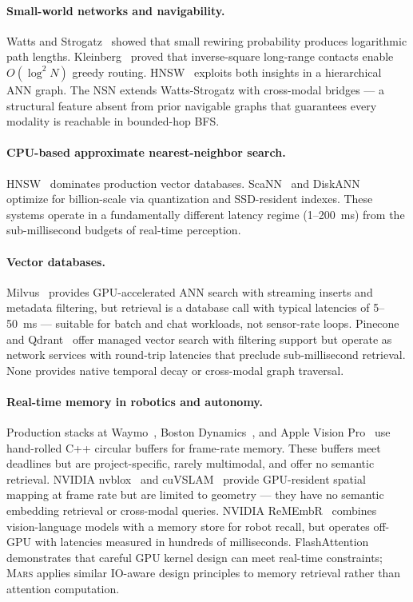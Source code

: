 \documentclass[11pt]{article}
\newcommand{\mars}{\textsc{Mars}}
\begin{document}
\paragraph{Small-world networks and navigability.}
Watts and Strogatz~\cite{wattsstrogatz} showed that small rewiring
probability produces logarithmic path lengths.
Kleinberg~\cite{kleinberg} proved that inverse-square long-range
contacts enable $O(\log^2 N)$ greedy routing. HNSW~\cite{hnsw} exploits
both insights in a hierarchical ANN graph. The NSN extends
Watts-Strogatz with cross-modal bridges --- a structural feature absent
from prior navigable graphs that guarantees every modality is reachable
in bounded-hop BFS.

\paragraph{CPU-based approximate nearest-neighbor search.}
HNSW~\cite{hnsw} dominates production vector databases.
ScaNN~\cite{scann} and DiskANN~\cite{diskann} optimize for
billion-scale via quantization and SSD-resident indexes. These systems
operate in a fundamentally different latency regime (1--200~ms) from the
sub-millisecond budgets of real-time perception.

\paragraph{Vector databases.}
Milvus~\cite{milvus} provides GPU-accelerated ANN search with streaming
inserts and metadata filtering, but retrieval is a database call with
typical latencies of 5--50~ms --- suitable for batch and chat workloads,
not sensor-rate loops. Pinecone~\cite{pinecone} and
Qdrant~\cite{qdrant} offer managed vector search with filtering support
but operate as network services with round-trip latencies that preclude
sub-millisecond retrieval. None provides native temporal decay or
cross-modal graph traversal.

\paragraph{Real-time memory in robotics and autonomy.}
Production stacks at Waymo~\cite{waymo2020}, Boston
Dynamics~\cite{atlasctrl}, and Apple Vision Pro~\cite{visionpro} use
hand-rolled C++ circular buffers for frame-rate memory. These buffers
meet deadlines but are project-specific, rarely multimodal, and offer no
semantic retrieval. NVIDIA nvblox~\cite{nvblox} and
cuVSLAM~\cite{cuVSLAM} provide GPU-resident spatial mapping at frame
rate but are limited to geometry --- they have no semantic embedding
retrieval or cross-modal queries. NVIDIA
ReMEmbR~\cite{remembr} combines vision-language models with a memory
store for robot recall, but operates off-GPU with latencies measured in
hundreds of milliseconds. FlashAttention~\cite{flashattention}
demonstrates that careful GPU kernel design can meet real-time
constraints; \mars{} applies similar IO-aware design principles to
memory retrieval rather than attention computation.
\end{document}

